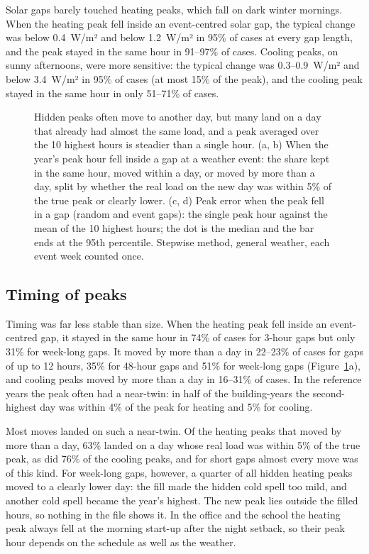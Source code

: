 Solar gaps barely touched heating peaks, which fall on dark winter mornings. When the heating peak fell inside an event-centred solar gap, the typical change was below 0.4~W/m² and below 1.2~W/m² in 95\% of cases at every gap length, and the peak stayed in the same hour in 91--97\% of cases. Cooling peaks, on sunny afternoons, were more sensitive: the typical change was 0.3--0.9~W/m² and below 3.4~W/m² in 95\% of cases (at most 15\% of the peak), and the cooling peak stayed in the same hour in only 51--71\% of cases.

\begin{figure}[tbp]
\centering
{}
\caption{Hidden peaks often move to another day, but many land on a day that already had almost the same load, and a peak averaged over the 10 highest hours is steadier than a single hour. (a, b) When the year's peak hour fell inside a gap at a weather event: the share kept in the same hour, moved within a day, or moved by more than a day, split by whether the real load on the new day was within 5\% of the true peak or clearly lower. (c, d) Peak error when the peak fell in a gap (random and event gaps): the single peak hour against the mean of the 10 highest hours; the dot is the median and the bar ends at the 95th percentile. Stepwise method, general weather, each event week counted once.}
\label{fig:8}
\end{figure}

\subsection{Timing of peaks}\label{sec:5.3}

Timing was far less stable than size. When the heating peak fell inside an event-centred gap, it stayed in the same hour in 74\% of cases for 3-hour gaps but only 31\% for week-long gaps. It moved by more than a day in 22--23\% of cases for gaps of up to 12 hours, 35\% for 48-hour gaps and 51\% for week-long gaps (Figure~\ref{fig:8}a), and cooling peaks moved by more than a day in 16--31\% of cases. In the reference years the peak often had a near-twin: in half of the building-years the second-highest day was within 4\% of the peak for heating and 5\% for cooling.

Most moves landed on such a near-twin. Of the heating peaks that moved by more than a day, 63\% landed on a day whose real load was within 5\% of the true peak, as did 76\% of the cooling peaks, and for short gaps almost every move was of this kind. For week-long gaps, however, a quarter of all hidden heating peaks moved to a clearly lower day: the fill made the hidden cold spell too mild, and another cold spell became the year's highest. The new peak lies outside the filled hours, so nothing in the file shows it. In the office and the school the heating peak always fell at the morning start-up after the night setback, so their peak hour depends on the schedule as well as the weather.

